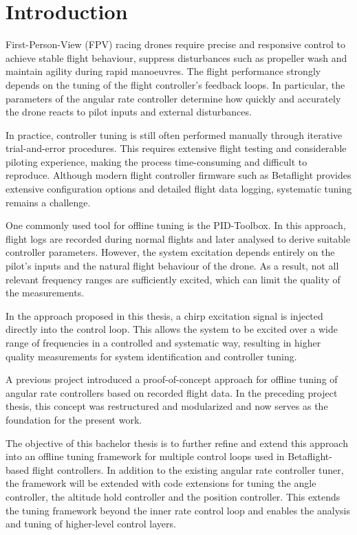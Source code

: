 \documentclass[a4paper,11pt,bibliography=totoc,listof=totoc]{scrreprt}
\begin{document}
\newpage

\section{Introduction}

First-Person-View (FPV) racing drones require precise and responsive control 
to achieve stable flight behaviour, suppress disturbances such as propeller 
wash and maintain agility during rapid manoeuvres. The flight performance 
strongly depends on the tuning of the flight controller’s feedback loops. 
In particular, the parameters of the angular rate controller determine how 
quickly and accurately the drone reacts to pilot inputs and external disturbances.

In practice, controller tuning is still often performed manually through 
iterative trial-and-error procedures. This requires extensive flight testing 
and considerable piloting experience, making the process time-consuming and 
difficult to reproduce. Although modern flight controller firmware such as 
Betaflight provides extensive configuration options and detailed flight data 
logging, systematic tuning remains a challenge.

One commonly used tool for offline tuning is the PID-Toolbox. In this approach, 
flight logs are recorded during normal flights and later analysed to derive 
suitable controller parameters. However, the system excitation depends entirely 
on the pilot’s inputs and the natural flight behaviour of the drone. As a result, 
not all relevant frequency ranges are sufficiently excited, which can limit the 
quality of the measurements.

In the approach proposed in this thesis, a chirp excitation signal is injected 
directly into the control loop. This allows the system to be excited over a wide 
range of frequencies in a controlled and systematic way, resulting in higher 
quality measurements for system identification and controller tuning.

A previous project introduced a proof-of-concept approach for offline tuning of 
angular rate controllers based on recorded flight data. In the preceding project 
thesis, this concept was restructured and modularized and now serves as the 
foundation for the present work.

The objective of this bachelor thesis is to further refine and extend this 
approach into an offline tuning framework for multiple control loops used in 
Betaflight-based flight controllers. In addition to the existing angular rate 
controller tuner, the framework will be extended with code extensions for tuning 
the angle controller, the altitude hold controller and the position controller. 
This extends the tuning framework beyond the inner rate control loop and enables 
the analysis and tuning of higher-level control layers.
\end{document}
